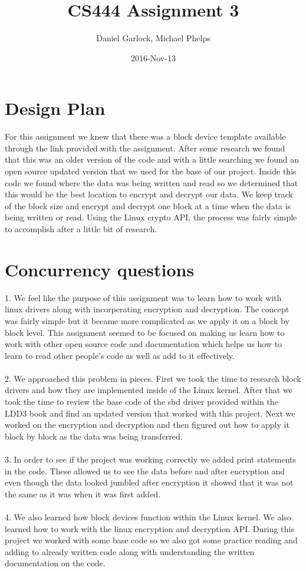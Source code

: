 \documentclass[letterpaper,10pt,titlepage,onecolumn,draftclsnofoot]{IEEETran}
\title{CS444 Assignment 3}
\author{Daniel Garlock, Michael Phelps}
\date{2016-Nov-13}
\begin{document}
\maketitle

\newpage
\tableofcontents
\newpage

\section{Design Plan}
For this assignment we knew that there was a block device template available through the link provided with the assignment. After some research we found that this was an older version of the code and with a little searching we found an open source updated version that we used for the base of our project. Inside this code we found where the data was being written and read so we determined that this would be the best location to encrypt and decrypt our data. We keep track of the block size and encrypt and decrypt one block at a time when the data is being written or read. Using the Linux crypto API, the process was fairly simple to accomplish after a little bit of research.

\section{Concurrency questions}
    1. We feel like the purpose of this assignment was to learn how to work with linux drivers along with incorperating encryption and decryption. The concept was fairly simple but it became more complicated as we apply it on a block by block level. This assignment seemed to be focused on making us learn how to work with other open source code and documentation which helps us how to learn to read other people's code as well as add to it effectively. \\
\\
    2. We approached this problem in pieces. First we took the time to research block drivers and how they are implemented inside of the Linux kernel. After that we took the time to review the base code of the sbd driver provided within the LDD3 book and find an updated version that worked with this project. Next we worked on the encryption and decryption and then figured out how to apply it block by block as the data was being transferred.  \\
\\
    3. In order to see if the project was working correctly we added print statements in the code. These allowed us to see the data before and after encryption and even though the data looked jumbled after encryption it showed that it was not the same as it was when it was first added. \\
\\
    4.  We also learned how block devices function within the Linux kernel. We also learned how to work with the linux encryption and decryption API. During this project we worked with some base code so we also got some practice reading and adding to already written code along with understanding the written documentation on the code.\\ 
\end{document}
